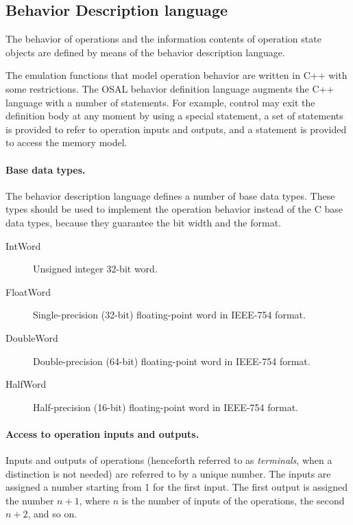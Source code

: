\documentclass[a4paper,twoside]{tceusermanual}
\begin{document}
\subsection{Behavior Description language}
\label{ssec:behaviour-commands}

The behavior of operations and the information contents of operation state
objects are defined by means of the behavior description language.

The emulation functions that model operation behavior are written in C++
with some restrictions.
The  OSAL behavior definition
language augments the C++ language with a number of statements.  For
example, 
control may exit the definition body at any moment by using a special 
statement, a set of statements is provided to refer to operation inputs
and 
outputs, and a statement is provided to access the memory model.

\paragraph{Base data types.}
The behavior description language defines a number of base data
types.  These types should be used to implement the operation behavior
instead of the C base data types, because they guarantee the bit width and
the format.
\begin{description}
\item[IntWord] %
  Unsigned integer 32-bit word.
\item[FloatWord] %
  Single-precision (32-bit) floating-point word in IEEE-754 format.
\item[DoubleWord] %
  Double-precision (64-bit) floating-point word in IEEE-754 format.
\item[HalfWord] %
  Half-precision (16-bit) floating-point word in IEEE-754 format.
\end{description}

\paragraph{Access to operation inputs and outputs.}
Inputs and outputs of operations (henceforth referred to as
\emph{terminals}, when a distinction is not needed) are referred to by a
unique number.  The inputs are assigned a number starting from 1 for the
first input.  The first output is assigned the number $n+1$, where $n$ is
the number of inputs of the operations, the second $n+2$, and so on.
\end{document}
